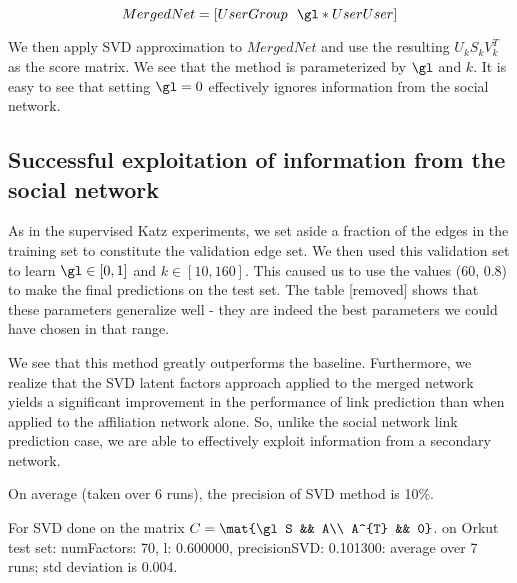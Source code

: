 \documentclass{report}
\begin{document}
\begin{equation*}
MergedNet = [UserGroup \ \ \gl * UserUser]
\end{equation*}

We then apply SVD approximation to $MergedNet$ and use the resulting $U_kS_kV_k^{T}$ as the score matrix. We see that the method is parameterized by $\gl$ and $k$. It is easy to see that setting $\gl = 0$ effectively ignores information from the social network.

\subsection{Successful exploitation of information from the social network}
As in the supervised Katz experiments, we set aside a fraction of the edges in the training set to constitute the validation edge set. We then used this validation set to learn $\gl \in [0, 1]$ and $k \in [10, 160]$. This caused us to use the values (60, 0.8) to make the final predictions on the test set. The table [removed] \tbc shows that these parameters generalize well - they are indeed the best parameters we could have chosen in that range.

We see that this method greatly outperforms the baseline. Furthermore, we realize that the SVD latent factors approach applied to the merged network yields a significant improvement in the performance of link prediction than when applied to the affiliation network alone. So, unlike the social network link prediction case, we are able to effectively exploit information from a secondary network.

On average (taken over 6 runs), the precision of SVD method is 10\%.

For SVD done on the matrix $C = \mat{\gl S && A\\ A^{T} && 0}$.
on Orkut test set: numFactors: 70, l: 0.600000, precisionSVD: 0.101300: average over 7 runs; std deviation is 0.004.
\end{document}
